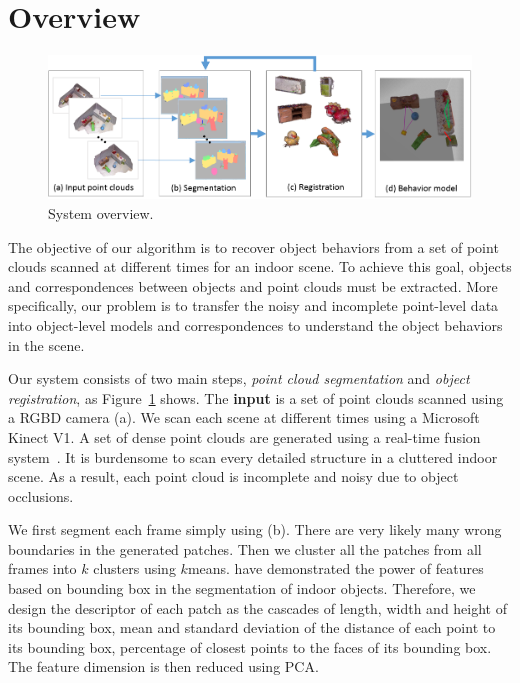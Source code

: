 \section{Overview}
\label{sec:overview}

\begin{figure}
	\includegraphics[width=1.0\textwidth]{figures/overview}
	\caption{System overview.}
	\label{fig:overview}
\end{figure}

The objective of our algorithm is to recover object behaviors from a set of point clouds scanned at different times for an indoor scene.
%
To achieve this goal, objects and correspondences between objects and point clouds must be extracted. 
%
More specifically, our problem is to transfer the noisy and incomplete point-level data into object-level models and correspondences to understand the object behaviors in the scene.
%


Our system consists of two main steps, \emph{point cloud segmentation} and \emph{object registration}, as Figure~\ref{fig:overview} shows. 
The \textbf{input} is a set of point clouds scanned using a RGBD camera (a). 
We scan each scene at different times  using a Microsoft Kinect V1. A set of dense point clouds are generated using a real-time fusion system~\cite{NieBner:2013:VoxelHashing}. 
%
It is burdensome to scan every detailed structure in a cluttered indoor scene. As a result, each point cloud is incomplete and noisy due to object occlusions.



We first segment each frame simply using  (b).
There are very likely many wrong boundaries in the generated patches.
Then we cluster all the patches from all frames into $k$ clusters using $k$means. 
%
\cite{Jia20153D} have demonstrated the power of features based on bounding box in the segmentation of indoor objects.
Therefore, we design the descriptor of each patch as the cascades of length, width and height of its bounding box, mean and standard deviation of the distance of each point to its bounding box, percentage of closest points to the faces of its bounding box.  
The feature dimension is then reduced using PCA. 



